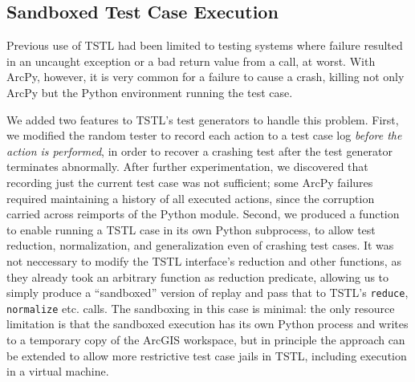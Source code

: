 \subsection{Sandboxed Test Case Execution}

Previous use of TSTL had been limited to testing systems where failure
resulted in an uncaught exception or a bad return value from a call,
at worst.  With ArcPy, however, it is very common for a failure to
cause a crash, killing not only ArcPy but the Python environment
running the test case.

We added two features to TSTL's test generators to handle this
problem.  First, we modified the random tester to record each action
to a test case log \emph{before the action is performed}, in order to recover a crashing
test after the test generator terminates abnormally.  After further experimentation,
we discovered that recording just the current test case was not
sufficient; some ArcPy failures required maintaining a history of all
executed actions, since the corruption carried across reimports of the
Python module.  Second, we produced a function
to enable running a TSTL case in its own Python subprocess, to allow
test reduction, normalization, and generalization even of crashing
test cases.  It was not neccessary to modify the TSTL interface's
reduction and other functions, as they already took an arbitrary
function as reduction predicate, allowing us to simply produce a
``sandboxed'' version of replay and pass that to TSTL's {\tt reduce}, {\tt
  normalize} etc. calls.  The sandboxing in this case is minimal:  the
only resource limitation is that the sandboxed execution has its own
Python process and writes to a temporary copy of the ArcGIS workspace,
but in principle the approach can be extended to allow more
restrictive test case jails in TSTL, including execution in a virtual machine.